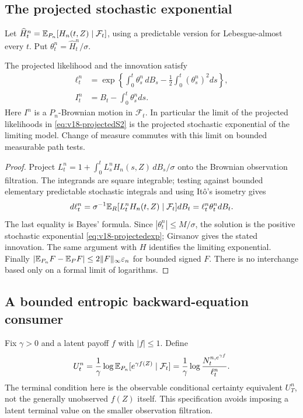 \subsection{The projected stochastic exponential}
Let $\widehat H_t^n=\mathbb E_{P_n}[H_n(t,Z)\mid\mathcal F_t]$, using a predictable
version for Lebesgue-almost every $t$. Put $\theta_t^n=\widehat H_t^n/\sigma$.

\begin{proposition}
\label{prop:v18-innovation}
The projected likelihood and the innovation satisfy
\begin{align}
 \ell_t^n&=\exp\left\{\int_0^t\theta_s^n\,dB_s
                         -\tfrac12\int_0^t(\theta_s^n)^2ds\right\},
                         \label{eq:v18-projectedexp}\\
 I_t^n&=B_t-\int_0^t\theta_s^n ds.
\end{align}
Here $I^n$ is a $P_n$-Brownian motion in $\mathcal F_t$. In particular the limit of the
projected likelihoods in \eqref{eq:v18-projectedS2} is the projected
stochastic exponential of the limiting model. Change of measure commutes
with this limit on bounded measurable path tests.
\end{proposition}
\begin{proof}
Project $L_t^n=1+\int_0^t L_s^nH_n(s,Z)\,dB_s/\sigma$ onto the Brownian
observation filtration. The integrands are square integrable; testing
against bounded elementary predictable stochastic integrals and using
It\^o's isometry gives
\[
 d\ell_t^n=\sigma^{-1}\mathbb E_R[L_t^nH_n(t,Z)\mid\mathcal F_t]dB_t
                 =\ell_t^n\theta_t^n dB_t.
\]
The last equality is Bayes' formula. Since $|\theta_t^n|\le M/\sigma$,
the solution is the positive stochastic exponential
\eqref{eq:v18-projectedexp}; Girsanov gives the stated innovation. The
same argument with $H$ identifies the limiting exponential. Finally
$|\mathbb E_{P_n}F-\mathbb E_PF|\le2\|F\|_\infty\varepsilon_n$ for bounded signed
$F$. There is no interchange based only on a formal limit of logarithms.
\end{proof}

\subsection{A bounded entropic backward-equation consumer}
Fix $\gamma>0$ and a latent payoff $f$ with $|f|\le1$. Define
\begin{equation}\label{eq:v18-entropicvalue}
 U_t^n=\frac1\gamma\log\mathbb E_{P_n}[e^{\gamma f(Z)}\mid\mathcal F_t]
       =\frac1\gamma\log\frac{N_t^{n,e^{\gamma f}}}{\ell_t^n}.
\end{equation}
The terminal condition here is the observable conditional certainty
equivalent $U_T^n$, not the generally unobserved $f(Z)$ itself. This
specification avoids imposing a latent terminal value on the smaller
observation filtration.

